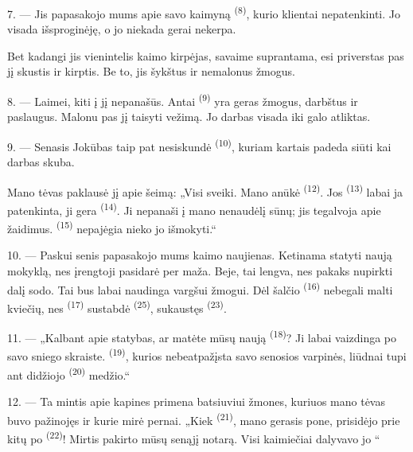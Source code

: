 7. --- Jis papasakojo mums apie savo kaimyną  \textsuperscript{(8)},
kurio klientai nepatenkinti. Jo  visada išsproginėję, o jo
 niekada gerai nekerpa.

Bet kadangi jis vienintelis kaimo kirpėjas, savaime suprantama, esi priverstas pas jį
skustis ir kirptis. Be to, jis šykštus ir nemalonus žmogus.

8. --- Laimei, kiti  į jį nepanašūs. Antai 
\textsuperscript{(9)} yra geras žmogus, darbštus ir paslaugus. Malonu pas jį taisyti
vežimą. Jo darbas visada iki galo atliktas.

9. --- Senasis Jokūbas taip pat nesiskundė  \textsuperscript{(10)},
kuriam kartais padeda siūti  kai darbas skuba.

Mano tėvas paklausė jį apie šeimą: „Visi sveiki. Mano anūkė 
\textsuperscript{(12)}. Jos  \textsuperscript{(13)} labai ja
patenkinta, ji gera  \textsuperscript{(14)}. Ji nepanaši į mano nenaudėlį
sūnų; jis tegalvoja apie žaidimus.  \textsuperscript{(15)}
nepajėgia nieko jo išmokyti.“

\VUsaut{3.0mm}
\VUsaut{3.0mm}

10. --- Paskui senis papasakojo mums kaimo naujienas. Ketinama statyti naują
mokyklą, nes įrengtoji  pasidarė per maža. Beje, tai
lengva, nes pakaks nupirkti dalį  sodo. Tai bus labai naudinga
vargšui žmogui. Dėl šalčio  \textsuperscript{(16)} 
nebegali malti kviečių, nes  \textsuperscript{(17)} sustabdė
 \textsuperscript{(25)}, sukaustęs  \textsuperscript{(23)}.

11. --- „Kalbant apie statybas, ar matėte mūsų naują 
\textsuperscript{(18)}? Ji labai vaizdinga po savo sniego skraiste. 
\textsuperscript{(19)}, kurios nebeatpažįsta savo senosios varpinės, liūdnai tupi ant
didžiojo  \textsuperscript{(20)} medžio.“

12. --- Ta mintis apie kapines primena batsiuviui žmones, kuriuos mano tėvas buvo
pažinojęs ir kurie mirė pernai. „Kiek  \textsuperscript{(21)}, mano
gerasis pone, prisidėjo prie kitų po  \textsuperscript{(22)}! Mirtis
pakirto mūsų senąjį notarą. Visi kaimiečiai dalyvavo jo “

